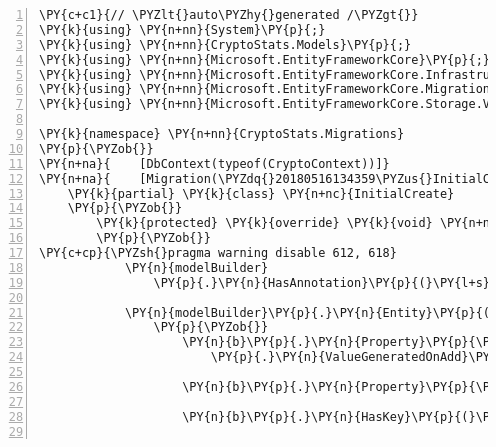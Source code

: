 \def\PYZbs{\char`\\}
\def\PYZus{\char`\_}
\def\PYZob{\char`\{}
\def\PYZcb{\char`\}}
\def\PYZca{\char`\^}
\def\PYZam{\char`\&}
\def\PYZlt{\char`\<}
\def\PYZgt{\char`\>}
\def\PYZsh{\char`\#}
\def\PYZpc{\char`\%}
\def\PYZdl{\char`\$}
\def\PYZhy{\char`\-}
\def\PYZsq{\char`\'}
\def\PYZdq{\char`\"}
\def\PYZti{\char`\~}
\def\PYZat{@}
\def\PYZlb{[}
\def\PYZrb{]}
\makeatother\begin{Verbatim}[commandchars=\\\{\},numbers=left,firstnumber=1,stepnumber=1,numberblanklines=0]
\PY{c+c1}{// \PYZlt{}auto\PYZhy{}generated /\PYZgt{}}
\PY{k}{using} \PY{n+nn}{System}\PY{p}{;}
\PY{k}{using} \PY{n+nn}{CryptoStats.Models}\PY{p}{;}
\PY{k}{using} \PY{n+nn}{Microsoft.EntityFrameworkCore}\PY{p}{;}
\PY{k}{using} \PY{n+nn}{Microsoft.EntityFrameworkCore.Infrastructure}\PY{p}{;}
\PY{k}{using} \PY{n+nn}{Microsoft.EntityFrameworkCore.Migrations}\PY{p}{;}
\PY{k}{using} \PY{n+nn}{Microsoft.EntityFrameworkCore.Storage.ValueConversion}\PY{p}{;}

\PY{k}{namespace} \PY{n+nn}{CryptoStats.Migrations}
\PY{p}{\PYZob{}}
\PY{n+na}{    [DbContext(typeof(CryptoContext))]}
\PY{n+na}{    [Migration(\PYZdq{}20180516134359\PYZus{}InitialCreate\PYZdq{})]}
    \PY{k}{partial} \PY{k}{class} \PY{n+nc}{InitialCreate}
    \PY{p}{\PYZob{}}
        \PY{k}{protected} \PY{k}{override} \PY{k}{void} \PY{n+nf}{BuildTargetModel}\PY{p}{(}\PY{n}{ModelBuilder} \PY{n}{modelBuilder}\PY{p}{)}
        \PY{p}{\PYZob{}}
\PY{c+cp}{\PYZsh{}pragma warning disable 612, 618}
            \PY{n}{modelBuilder}
                \PY{p}{.}\PY{n}{HasAnnotation}\PY{p}{(}\PY{l+s}{\PYZdq{}ProductVersion\PYZdq{}}\PY{p}{,} \PY{l+s}{\PYZdq{}2.1.0\PYZhy{}rc1\PYZhy{}32029\PYZdq{}}\PY{p}{)}\PY{p}{;}

            \PY{n}{modelBuilder}\PY{p}{.}\PY{n}{Entity}\PY{p}{(}\PY{l+s}{\PYZdq{}CryptoStats.Models.Exchange\PYZdq{}}\PY{p}{,} \PY{n}{b} \PY{p}{=}\PY{p}{\PYZgt{}}
                \PY{p}{\PYZob{}}
                    \PY{n}{b}\PY{p}{.}\PY{n}{Property}\PY{p}{\PYZlt{}}\PY{k+kt}{int}\PY{p}{\PYZgt{}}\PY{p}{(}\PY{l+s}{\PYZdq{}ExchangeId\PYZdq{}}\PY{p}{)}
                        \PY{p}{.}\PY{n}{ValueGeneratedOnAdd}\PY{p}{(}\PY{p}{)}\PY{p}{;}

                    \PY{n}{b}\PY{p}{.}\PY{n}{Property}\PY{p}{\PYZlt{}}\PY{k+kt}{string}\PY{p}{\PYZgt{}}\PY{p}{(}\PY{l+s}{\PYZdq{}Name\PYZdq{}}\PY{p}{)}\PY{p}{;}

                    \PY{n}{b}\PY{p}{.}\PY{n}{HasKey}\PY{p}{(}\PY{l+s}{\PYZdq{}ExchangeId\PYZdq{}}\PY{p}{)}\PY{p}{;}


\end{Verbatim}
